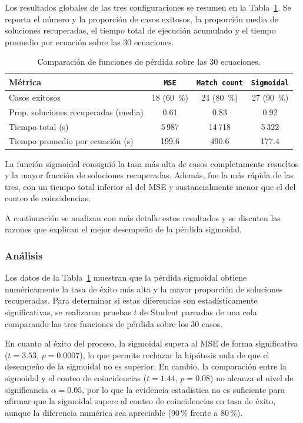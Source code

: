 \documentclass{article} \usepackage[utf8]{inputenc} \usepackage[spanish]{babel} \usepackage{amsmath, amssymb, amsthm} \usepackage{bm} \usepackage{float} \usepackage{longtable} \usepackage[hidelinks]{hyperref} \spanishdecimal{.}
\begin{document}
Los resultados globales de las tres configuraciones se resumen en la Tabla~\ref{tab:comparacion_perdida}. Se reporta el número y la proporción de casos exitosos, la proporción media de soluciones recuperadas, el tiempo total de ejecución acumulado y el tiempo promedio por ecuación sobre las 30 ecuaciones.

\begin{table}[H] \centering \caption{Comparación de funciones de pérdida sobre las 30 ecuaciones.} \label{tab:comparacion_perdida} \begin{tabular}{lccc} \hline
Métrica & \texttt{MSE} & \texttt{Match count} & \texttt{Sigmoidal} \\
\hline
Casos exitosos & 18 (60~\%) & 24 (80~\%) & 27 (90~\%) \\
Prop. soluciones recuperadas (media) & 0.61 & 0.83 & 0.92 \\
Tiempo total (s) & 5\,987 & 14\,718 & 5\,322 \\
Tiempo promedio por ecuación (s) & 199.6 & 490.6 & 177.4 \\
\hline \end{tabular} \end{table}

La función sigmoidal consiguió la tasa más alta de casos completamente resueltos y la mayor fracción de soluciones recuperadas. Además, fue la más rápida de las tres, con un tiempo total inferior al del MSE y sustancialmente menor que el del conteo de coincidencias.

A continuación se analizan con más detalle estos resultados y se discuten las razones que explican el mejor desempeño de la pérdida sigmoidal.

\subsubsection{Análisis}

Los datos de la Tabla~\ref{tab:comparacion_perdida} muestran que la pérdida sigmoidal obtiene numéricamente la tasa de éxito más alta y la mayor proporción de soluciones recuperadas. Para determinar si estas diferencias son estadísticamente significativas, se realizaron pruebas $t$ de Student pareadas de una cola comparando las tres funciones de pérdida sobre los 30 casos.

En cuanto al éxito del proceso, la sigmoidal supera al MSE de forma significativa ($t = 3.53$, $p = 0.0007$), lo que permite rechazar la hipótesis nula de que el desempeño de la sigmoidal no es superior. En cambio, la comparación entre la sigmoidal y el conteo de coincidencias ($t = 1.44$, $p = 0.08$) no alcanza el nivel de significancia $\alpha = 0.05$, por lo que la evidencia estadística no es suficiente para afirmar que la sigmoidal supere al conteo de coincidencias en tasa de éxito, aunque la diferencia numérica sea apreciable (90\,\% frente a 80\,\%).
\end{document}

